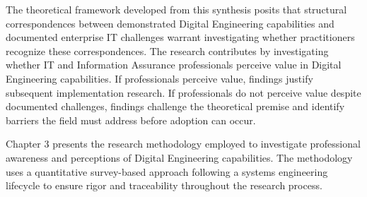 The theoretical framework developed from this synthesis posits that structural correspondences between demonstrated Digital Engineering capabilities and documented enterprise IT challenges warrant investigating whether practitioners recognize these correspondences. The research contributes by investigating whether IT and Information Assurance professionals perceive value in Digital Engineering capabilities. If professionals perceive value, findings justify subsequent implementation research. If professionals do not perceive value despite documented challenges, findings challenge the theoretical premise and identify barriers the field must address before adoption can occur.

Chapter 3 presents the research methodology employed to investigate professional awareness and perceptions of Digital Engineering capabilities. The methodology uses a quantitative survey-based approach following a systems engineering lifecycle to ensure rigor and traceability throughout the research process.